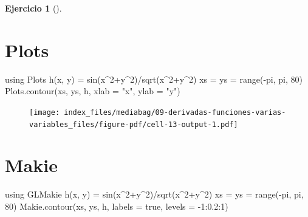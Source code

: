 \documentclass[
  a4paper,
]{scrreport}
\newenvironment{Shaded}{\begin{snugshade}}{\end{snugshade}}
\newcommand{\BuiltInTok}[1]{\textcolor[rgb]{0.00,0.23,0.31}{#1}}
\newcommand{\ConstantTok}[1]{\textcolor[rgb]{0.56,0.35,0.01}{#1}}
\newcommand{\FloatTok}[1]{\textcolor[rgb]{0.68,0.00,0.00}{#1}}
\newcommand{\FunctionTok}[1]{\textcolor[rgb]{0.28,0.35,0.67}{#1}}
\newcommand{\ImportTok}[1]{\textcolor[rgb]{0.00,0.46,0.62}{#1}}
\newcommand{\NormalTok}[1]{\textcolor[rgb]{0.00,0.23,0.31}{#1}}
\newcommand{\OperatorTok}[1]{\textcolor[rgb]{0.37,0.37,0.37}{#1}}
\newcommand{\StringTok}[1]{\textcolor[rgb]{0.13,0.47,0.30}{#1}}
\theoremstyle{definition}
\newtheorem{exercise}{Ejercicio}[chapter]
\theoremstyle{remark}
\begin{document}
\begin{exercise}[]
\begin{enumerate}
\begin{tcolorbox}
  \section{Plots}

\begin{Shaded}
\begin{Highlighting}[]
\ImportTok{using} \BuiltInTok{Plots}
\FunctionTok{h}\NormalTok{(x, y) }\OperatorTok{=} \FunctionTok{sin}\NormalTok{(x}\OperatorTok{\^{}}\FloatTok{2}\OperatorTok{+}\NormalTok{y}\OperatorTok{\^{}}\FloatTok{2}\NormalTok{)}\OperatorTok{/}\FunctionTok{sqrt}\NormalTok{(x}\OperatorTok{\^{}}\FloatTok{2}\OperatorTok{+}\NormalTok{y}\OperatorTok{\^{}}\FloatTok{2}\NormalTok{)}
\NormalTok{xs }\OperatorTok{=}\NormalTok{ ys }\OperatorTok{=} \FunctionTok{range}\NormalTok{(}\OperatorTok{{-}}\ConstantTok{pi}\NormalTok{, }\ConstantTok{pi}\NormalTok{, }\FloatTok{80}\NormalTok{)}
\NormalTok{Plots.}\FunctionTok{contour}\NormalTok{(xs, ys, h, xlab }\OperatorTok{=} \StringTok{"x"}\NormalTok{, ylab }\OperatorTok{=} \StringTok{"y"}\NormalTok{)}
\end{Highlighting}
\end{Shaded}

  \begin{figure}[H]

  {\centering \texttt{[image: index\_files/mediabag/09-derivadas-funciones-varias-variables\_files/figure-pdf/cell-13-output-1.pdf]}

  }

  \end{figure}

  \section{Makie}

\begin{Shaded}
\begin{Highlighting}[]
\ImportTok{using} \BuiltInTok{GLMakie}
\FunctionTok{h}\NormalTok{(x, y) }\OperatorTok{=} \FunctionTok{sin}\NormalTok{(x}\OperatorTok{\^{}}\FloatTok{2}\OperatorTok{+}\NormalTok{y}\OperatorTok{\^{}}\FloatTok{2}\NormalTok{)}\OperatorTok{/}\FunctionTok{sqrt}\NormalTok{(x}\OperatorTok{\^{}}\FloatTok{2}\OperatorTok{+}\NormalTok{y}\OperatorTok{\^{}}\FloatTok{2}\NormalTok{)}
\NormalTok{xs }\OperatorTok{=}\NormalTok{ ys }\OperatorTok{=} \FunctionTok{range}\NormalTok{(}\OperatorTok{{-}}\ConstantTok{pi}\NormalTok{, }\ConstantTok{pi}\NormalTok{, }\FloatTok{80}\NormalTok{)}
\NormalTok{Makie.}\FunctionTok{contour}\NormalTok{(xs, ys, h, labels }\OperatorTok{=} \ConstantTok{true}\NormalTok{,  levels }\OperatorTok{=} \OperatorTok{{-}}\FloatTok{1}\OperatorTok{:}\FloatTok{0.2}\OperatorTok{:}\FloatTok{1}\NormalTok{)}
\end{Highlighting}
\end{Shaded}


\end{tcolorbox}
\end{enumerate}
\end{exercise}
\end{document}
